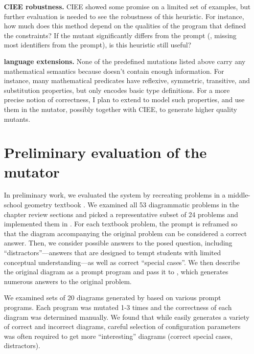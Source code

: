 \vspace{10pt}

\begin{proposed}
\textbf{CIEE robustness.} CIEE showed some promise on a limited set of examples, but further evaluation is needed to see the robustness of this heuristic. For instance, how much does this method depend on the qualities of the \Style program that defined the constraints? If the mutant significantly differs from the prompt (\eg, missing most identifiers from the prompt), is this heuristic still useful?

\textbf{\Domain language extensions.} None of the predefined mutations listed above carry any mathematical semantics because \Domain doesn't contain enough information. For instance, many mathematical predicates have reflexive, symmetric, transitive, and substitution properties, but \Domain only encodes basic type definitions. For a more precise notion of correctness, I plan to extend \Domain to model such properties, and use them in the \Edgeworth mutator, possibly together with CIEE, to generate higher quality mutants.  

\end{proposed}

\section{Preliminary evaluation of the \Edgeworth mutator}
\label{sec:edgeworth-prelim-eval}

In preliminary work, we evaluated the system by recreating problems in a middle-school geometry textbook \cite{holtGeometry}. We examined all 53 diagrammatic problems in the chapter review sections and picked a representative subset of 24 problems and implemented them in \Edgeworth. For each textbook problem, the prompt is reframed so that the diagram accompanying the original problem can be considered a correct answer. Then, we consider possible answers to the posed question, including ``distractors''---answers that are designed to tempt students with limited conceptual understanding---as well as correct ``special cases''. We then describe the original diagram as a prompt \Substance program and pass it to \Edgeworth, which generates numerous answers to the original problem.

We examined sets of 20 diagrams generated by \Edgeworth based on various prompt programs. Each program was mutated 1-3 times and the correctness of each diagram was determined manually. We found that while \Edgeworth easily generates a variety of correct and incorrect diagrams, careful selection of configuration parameters was often required to get more ``interesting'' diagrams (correct special cases, distractors).

